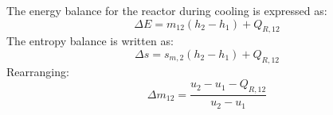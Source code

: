 The energy balance for the reactor during cooling is expressed as:  
\[
\Delta E = m_{12} (h_2 - h_1) + Q_{R,12}
\]  
The entropy balance is written as:  
\[
\Delta s = s_{m,2} (h_2 - h_1) + Q_{R,12}
\]  
Rearranging:  
\[
\Delta m_{12} = \frac{u_2 - u_1 - Q_{R,12}}{u_2 - u_1}
\]